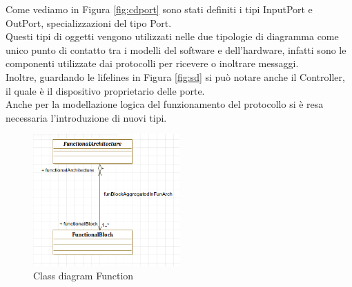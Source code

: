 \noindent Come vediamo in Figura \ref{fig:cdport} sono stati definiti i tipi InputPort e OutPort, specializzazioni del tipo Port.\\
Questi tipi di oggetti vengono utilizzati nelle due tipologie di diagramma come unico punto di contatto tra i modelli del software e dell'hardware, infatti sono le componenti utilizzate dai protocolli per ricevere o inoltrare messaggi.\\
Inoltre, guardando le lifelines in Figura \ref{fig:sd} si può notare anche il Controller, il quale è il dispositivo proprietario delle porte.\\
Anche per la modellazione logica del funzionamento del protocollo si è resa necessaria l'introduzione di nuovi tipi.\\
\begin{figure}[h!]
    \centering
    \includegraphics[width=0.5\textwidth]{../img/cdfun.png} 
    \caption{Class diagram Function}
    \label{fig:cdfun}
\end{figure}

